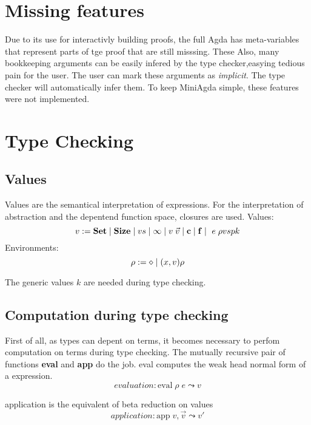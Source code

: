 \section{Missing features}
Due to its use for interactivly building proofs, the full Agda has meta-variables that represent parts of tge proof that are still misssing. These 
Also, many bookkeeping arguments can be easily infered by the type checker,easying tedious pain for the user.
The user can mark these arguments as \emph{implicit}. The type checker will automatically infer them.
To keep MiniAgda simple, these features were not implemented.

\section{Type Checking}

\renewcommand\Check[4]{#1,#2\;\vdash\;#3\uparrow#4}
\newcommand\Infer[4]{#1,#2\;\vdash\;#3\downarrow#4}
\newcommand\IsType[3]{#1,#2\;\vdash\;#3\uparrow\Set}
\newcommand\EqVal[2]{\vdash\;#1\leftrightarrow#2}
\newcommand\Eval[3]{\mathrm{eval}\;#1\;#2\leadsto#3}
\newcommand\App[3]{\mathrm{app}\;#1,#2\leadsto#3}
\newcommand\AppFun[3]{\mathrm{appFun}\;#1,#2,\leadsto#3}
\newcommand\Fapp[6]{\mathrm{fapp}\;#1,#2,#3,#4,#5\leadsto#6}
\newcommand\Whnf[2]{\mathrm{whnf}\;#1\leadsto#2}
\newcommand\Lookup[3]{#1(#2) = #3}

\subsection{Values}
Values are the semantical interpretation of expressions.
For the interpretation of abstraction and the depentend function space, closures are used.
Values:
\[ v := \mathbf{Set} \;\vert\; \mathbf{Size} \;\vert\; vs \;\vert\; \infty \;\vert\; v \; \vec{v} \;\vert\; \mathbf{c} \;\vert\; \mathbf{f} \;\vert\; \ e \; \rho vsp k \]
Environments:
\[ \rho := \diamond \;\vert\; (x,v) \rho \]

The generic values $k$ are needed during type checking.
\subsection{Computation during type checking}
First of all, as types can depent on terms, it becomes necessary to perfom computation on terms during type checking.
The mutually recursive pair of functions 
\textbf{eval} and \textbf{app} do the job.
eval computes the weak head normal form of a expression.
\[ evaluation : \Eval{\rho}{e}{v}\]

application is the equivalent of beta reduction on values
\[ application : \App{v}{\vec{v}}{v'}\]

